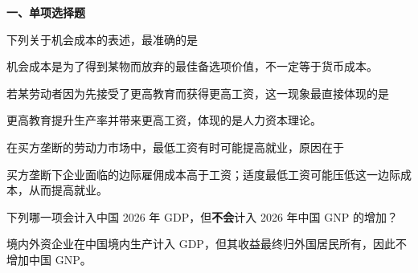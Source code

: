 ﻿


\textbf{一、单项选择题}

\begin{question}
下列关于机会成本的表述，最准确的是
\begin{choiceoptions}[2]
\end{choiceoptions}
\begin{solution}
机会成本是为了得到某物而放弃的最佳备选项价值，不一定等于货币成本。
\end{solution}
\end{question}

\begin{question}
若某劳动者因为先接受了更高教育而获得更高工资，这一现象最直接体现的是
\begin{choiceoptions}[2]
\end{choiceoptions}
\begin{solution}
更高教育提升生产率并带来更高工资，体现的是人力资本理论。
\end{solution}
\end{question}

\begin{question}
在买方垄断的劳动力市场中，最低工资有时可能提高就业，原因在于
\begin{choiceoptions}[2]
\end{choiceoptions}
\begin{solution}
买方垄断下企业面临的边际雇佣成本高于工资；适度最低工资可能压低这一边际成本，从而提高就业。
\end{solution}
\end{question}

\begin{question}
下列哪一项会计入中国 2026 年 GDP，但\textbf{不会}计入 2026 年中国 GNP 的增加？
\begin{choiceoptions}[2]
\end{choiceoptions}
\begin{solution}
境内外资企业在中国境内生产计入 GDP，但其收益最终归外国居民所有，因此不增加中国 GNP。
\end{solution}
\end{question}

